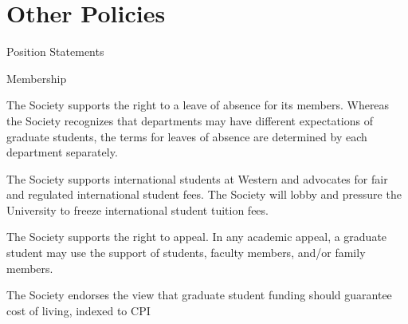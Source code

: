 \section{Other Policies}
\begin{longenum}[label*=\thesection.\arabic*., align=left]
\item Position Statements
\begin{longenum}[label*=\arabic*., align=left]
\item Membership
\begin{longenum}[label*=\arabic*., align=left]
\item The Society supports the right to a leave of absence for its members. Whereas the Society recognizes that departments may have different expectations of graduate students, the terms for leaves of absence are determined by each department separately.
\item The Society supports international students at Western and advocates for fair and regulated international student fees. The Society will lobby and pressure the University to freeze international student tuition fees.
\item The Society supports the right to appeal. In any academic appeal, a graduate student may use the support of students, faculty members, and/or family members.
\item The Society endorses the view that graduate student funding should guarantee cost of living, indexed to CPI
\end{longenum}
\end{longenum}
\end{longenum}